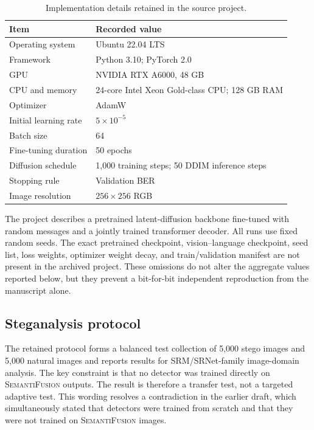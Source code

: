 \documentclass[pdflatex,sn-mathphys-num]{sn-jnl}
\newcommand{\method}{\textsc{SemantiFusion}}
\begin{document}
\begin{table}[t]
\centering
\caption{Implementation details retained in the source project.}
\label{tab:implementation}
\begin{tabularx}{\columnwidth}{p{3.1cm}X}
\toprule
\textbf{Item} & \textbf{Recorded value} \\
\midrule
Operating system & Ubuntu 22.04 LTS \\
Framework & Python 3.10; PyTorch 2.0 \\
GPU & NVIDIA RTX A6000, 48 GB \\
CPU and memory & 24-core Intel Xeon Gold-class CPU; 128 GB RAM \\
Optimizer & AdamW \\
Initial learning rate & $5\times10^{-5}$ \\
Batch size & 64 \\
Fine-tuning duration & 50 epochs \\
Diffusion schedule & 1,000 training steps; 50 DDIM inference steps \\
Stopping rule & Validation BER \\
Image resolution & $256\times256$ RGB \\
\bottomrule
\end{tabularx}
\end{table}

The project describes a pretrained latent-diffusion backbone fine-tuned with random messages and a jointly trained transformer decoder. All runs use fixed random seeds. The exact pretrained checkpoint, vision--language checkpoint, seed list, loss weights, optimizer weight decay, and train/validation manifest are not present in the archived project. These omissions do not alter the aggregate values reported below, but they prevent a bit-for-bit independent reproduction from the manuscript alone.

\subsection{Steganalysis protocol}

The retained protocol forms a balanced test collection of 5,000 stego images and 5,000 natural images and reports results for SRM/SRNet-family image-domain analysis. The key constraint is that no detector was trained directly on \method{} outputs. The result is therefore a transfer test, not a targeted adaptive test. This wording resolves a contradiction in the earlier draft, which simultaneously stated that detectors were trained from scratch and that they were not trained on \method{} images.
\end{document}
